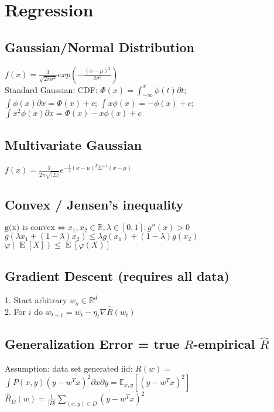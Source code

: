 \section*{Regression}
\subsection*{Gaussian/Normal Distribution}
$f(x) = \frac{1}{\sqrt{2\pi\sigma^2}} exp(-\frac{(x-\mu)^2}{2\sigma^2})$\\
Standard Gaussian: CDF: $\Phi(x) = \int_{-\infty}^{x} \phi(t) \partial t$;\\ %
$\int \phi(x) \partial x = \Phi(x) + c$;
$\int x \phi(x) = -\phi(x) + c$; $\int x^2 \phi(x) \partial x = \Phi(x) -x \phi(x) + c$


\subsection*{Multivariate Gaussian}
$f(x) = \frac{1}{2\pi \sqrt{|\Sigma|}} e^{- \frac{1}{2} (x-\mu)^T \Sigma^{-1} (x-\mu)}$

\subsection*{Convex / Jensen's inequality}
$\text{g(x) is convex} \Leftrightarrow x_1,x_2 \in \mathbb{R}, \lambda \in [0,1]: g''(x) > 0$\\
$g(\lambda x_1 + (1-\lambda) x_2) \leq \lambda g(x_1) + (1-\lambda) g(x_2)$
$\varphi(\operatorname{E}[X]) \leq  \operatorname{E}[\varphi(X)]$

\subsection*{Gradient Descent (requires all data)}
1. Start arbitrary $w_o \in \mathbb{R}^d$\\
2. For $i$ do $w_{t+1} = w_t - \eta_t \nabla \hat{R}(w_t)$

\subsection*{Generalization Error = true $R$-empirical $\hat{R}$}
Assumption: data set generated iid: $R(w) =$\\ 
$\int P(x,y) (y-w^Tx)^2 \partial x \partial y = \mathbb{E}_{x,y}[(y-w^Tx)^2]$\\
$\hat{R}_D(w) = \frac{1}{|D|}\sum_{(x,y)\in D} (y-w^Tx)^2$

